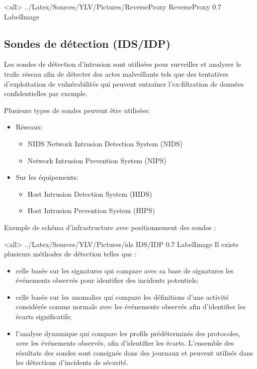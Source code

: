 \mode<all>{\picframe
{../Latex/Sources/YLV/Pictures/ReverseProxy}%
{ReverseProxy} %
{0.7} %
{LabelImage} %
}
\subsection{Sondes de détection (IDS/IDP)}

Les sondes de détection d'intrusion sont utilisées pour surveiller et analyser le trafic réseau afin de détecter des actes malveillants tels que des tentatives d'exploitation de vulnérabilités qui peuvent entraîner l'ex-filtration de données confidentielles par exemple. 

Plusieurs types de sondes peuvent être utilisées:
\begin{itemize}
\item Réseaux:
\begin{itemize}
\item NIDS Network Intrusion Detection System (NIDS)
\item Network Intrusion Prevention System (NIPS)
\end{itemize}
\item Sur les équipements:
\begin{itemize}
\item Host Intrusion Detection System (HIDS)
\item Host Intrusion Prevention System (HIPS)
\end{itemize}
\end{itemize}
Exemple de schéma d'infrastructure avec positionnement des sondes :

\mode<all>{\picframe
{../Latex/Sources/YLV/Pictures/ids}%
{IDS/IDP} %
{0.7} %
{LabelImage} %
}
Il existe plusieurs méthodes de détection telles que :
\begin{itemize}
\item celle basée sur les signatures qui compare avec sa base de signatures les événements observés pour identifier des incidents potentiels;
\item celle basée sur les anomalies qui compare les définitions d'une activité considérée comme normale avec les événements observés afin d'identifier les écarts significatifs;
\item l'analyse dynamique qui compare les profils prédéterminés des protocoles, avec les événements observés, afin d'identifier les écarts.
L'ensemble des résultats des sondes sont consignés dans des journaux et peuvent utilisés dans les détections d'incidents de sécurité. 
\end{itemize}

